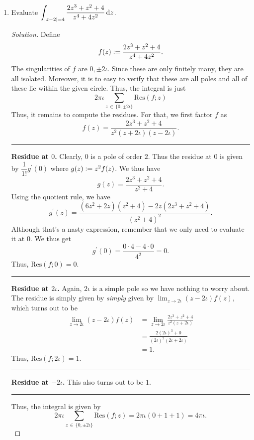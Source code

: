 \documentclass[11pt]{article}
\theoremstyle{definition}
\newenvironment{soln}{\begin{proof}[Solution]}{\end{proof}}
\begin{document}
\begin{enumerate}[leftmargin=*]
    \item Evaluate $\displaystyle\int_{\abs{z-2}=4} \frac{2z^3 + z^2 + 4}{z^4 + 4z^2} \, \mathrm{d}z$.
    
    \begin{soln}
        Define
        \[
            f(z) \vcentcolon= \frac{2z^3 + z^2 + 4}{z^4 + 4z^2}.
        \]
        The singularities of $f$ are $0,\pm2\iota$. Since these are only finitely many, they are all isolated. Moreover, it is to easy to verify that these are all poles and all of these lie within the given circle. Thus, the integral is just
        \[
            2\pi\iota \sum_{z \, \in \, \{0,\pm2\iota\}} \text{Res}(f;z)
        \]
        Thus, it remains to compute the residues. For that, we first factor $f$ as
        \[
            f(z) = \frac{2z^3 + z^2 + 4}{z^2(z+2\iota)(z-2\iota)}.
        \]
        \par\noindent\rule{\textwidth}{0.4pt}
        \textbf{Residue at $0$.} Clearly, $0$ is a pole of order $2$. Thus the residue at $0$ is given by $\dfrac{1}{1!} g^{\prime}(0)$ where $g(z) \vcentcolon= z^2f(z)$. We thus have
        \[
            g(z) = \frac{2z^3 + z^2 + 4}{z^2 + 4}.
        \]
        Using the quotient rule, we have
        \[
            g^{\prime}(z) = \frac{(6z^2 + 2z)(z^2 + 4) - 2z(2z^3 + z^2 + 4)}{(z^2 + 4)^2}.
        \]
        Although that's a nasty expression, remember that we only need to evaluate it at $0$. We thus get
        \[
            g^{\prime}(0) = \frac{0\cdot4 - 4\cdot0}{4^2} = 0.
        \]
        Thus, $\text{Res}(f;0) = 0$.
        \par\noindent\rule{\textwidth}{0.4pt}
        \textbf{Residue at $2\iota$.} Again, $2\iota$ is a simple pole so we have nothing to worry about. The residue is simply given by \emph{simply} given by $\displaystyle\lim_{z \to 2\iota} (z-2\iota)f(z)$, which turns out to be
        \begin{align*}
            \lim_{z \to 2\iota} (z-2\iota) f(z) &= \lim_{z \to 2\iota} \frac{2z^3 + z^2 + 4}{z^2(z+2\iota)} \\
            &= \frac{2(2\iota)^3 + 0}{(2\iota)^2(2\iota + 2\iota)} \\
            &= 1.
        \end{align*}
        Thus, $\text{Res}(f;2\iota) = 1$.
        \par\noindent\rule{\textwidth}{0.4pt}
        \textbf{Residue at $-2\iota$.} This also turns out to be $1$. 
        \par\noindent\rule{\textwidth}{0.4pt}
        Thus, the integral is given by
        \[
            2\pi\iota \sum_{z \, \in \, \{0,\pm2\iota\}} \text{Res}(f;z) = 2\pi\iota (0 + 1 + 1) = \boxed{4\pi\iota.}
        \]
    \end{soln}
    

\end{enumerate}
\end{document}

